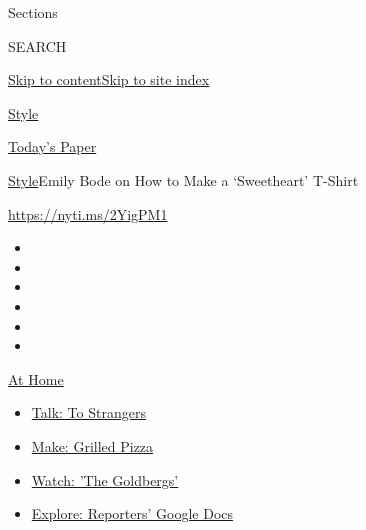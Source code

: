 Sections

SEARCH

\protect\hyperlink{site-content}{Skip to
content}\protect\hyperlink{site-index}{Skip to site index}

\href{https://www.nytimes3xbfgragh.onion/section/style}{Style}

\href{https://myaccount.nytimes3xbfgragh.onion/auth/login?response_type=cookie\&client_id=vi}{}

\href{https://www.nytimes3xbfgragh.onion/section/todayspaper}{Today's
Paper}

\href{/section/style}{Style}\textbar{}Emily Bode on How to Make a
`Sweetheart' T-Shirt

\url{https://nyti.ms/2YigPM1}

\begin{itemize}
\item
\item
\item
\item
\item
\item
\end{itemize}

\href{https://www.nytimes3xbfgragh.onion/spotlight/at-home?action=click\&pgtype=Article\&state=default\&region=TOP_BANNER\&context=at_home_menu}{At
Home}

\begin{itemize}
\tightlist
\item
  \href{https://www.nytimes3xbfgragh.onion/2020/08/03/well/family/the-benefits-of-talking-to-strangers.html?action=click\&pgtype=Article\&state=default\&region=TOP_BANNER\&context=at_home_menu}{Talk:
  To Strangers}
\item
  \href{https://www.nytimes3xbfgragh.onion/2020/08/01/at-home/coronavirus-make-pizza-on-a-grill.html?action=click\&pgtype=Article\&state=default\&region=TOP_BANNER\&context=at_home_menu}{Make:
  Grilled Pizza}
\item
  \href{https://www.nytimes3xbfgragh.onion/2020/07/31/arts/television/goldbergs-abc-stream.html?action=click\&pgtype=Article\&state=default\&region=TOP_BANNER\&context=at_home_menu}{Watch:
  'The Goldbergs'}
\item
  \href{https://www.nytimes3xbfgragh.onion/interactive/2020/at-home/even-more-reporters-editors-diaries-lists-recommendations.html?action=click\&pgtype=Article\&state=default\&region=TOP_BANNER\&context=at_home_menu}{Explore:
  Reporters' Google Docs}
\end{itemize}

